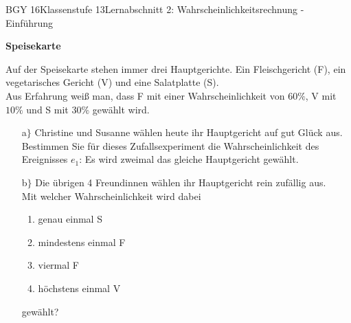 \documentclass[oneside,openany,headings=optiontotoc,11pt,numbers=noenddot]{scrreprt}
\begin{document}
	\begin{worksheet}{BGY 16}{Klassenstufe 13}{Lernabschnitt 2: Wahrscheinlichkeitsrechnung - Einführung}
				
		\noindent
		\sffamily
		\begin{framed}
			\noindent
			\huge{\textbf{Speisekarte}}\\
			\normalsize
			\par\noindent
			Auf der Speisekarte stehen immer drei Hauptgerichte. Ein Fleischgericht (F), ein vegetarisches Gericht (V) und eine Salatplatte (S).\\
			Aus Erfahrung weiß man, dass F mit einer Wahrscheinlichkeit von \(60\%\), V mit \(10\%\) und S mit \(30\%\) gewählt wird.
			\begin{itemize}
				\item[a$\rbrace$] Christine und Susanne wählen heute ihr Hauptgericht auf gut Glück aus.\\
				Bestimmen Sie für dieses Zufallsexperiment die Wahrscheinlichkeit des Ereignisses \(e_1\): \glqq{}Es wird zweimal das gleiche Hauptgericht gewählt.\grqq{}
				\item[b$\rbrace$] Die übrigen 4 Freundinnen wählen ihr Hauptgericht rein zufällig aus.\\
				Mit welcher Wahrscheinlichkeit wird dabei
				\begin{enumerate}
					\item genau einmal S
					\item mindestens einmal F
					\item viermal F
					\item höchstens einmal V
				\end{enumerate}
				gewählt?
			\end{itemize}
		\end{framed}
	\end{worksheet}
\end{document}
